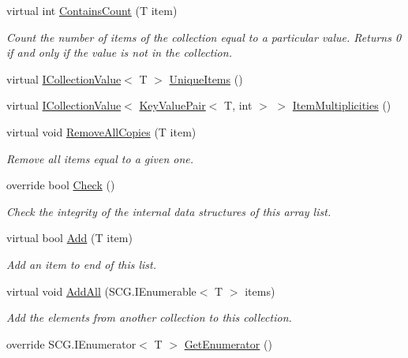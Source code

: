 \begin{DoxyCompactItemize}
virtual int \hyperlink{class_c5_1_1_hashed_array_list_a4fb06172f38039104765ee9d6ed78842}{Contains\+Count} (T item)
\begin{DoxyCompactList}\small\item\em Count the number of items of the collection equal to a particular value. Returns 0 if and only if the value is not in the collection. \end{DoxyCompactList}\item 
virtual \hyperlink{interface_c5_1_1_i_collection_value}{I\+Collection\+Value}$<$ T $>$ \hyperlink{class_c5_1_1_hashed_array_list_ab51e4a315e9d2a09ff389f64bc7a13a1}{Unique\+Items} ()
\item 
virtual \hyperlink{interface_c5_1_1_i_collection_value}{I\+Collection\+Value}$<$ \hyperlink{struct_c5_1_1_key_value_pair}{Key\+Value\+Pair}$<$ T, int $>$ $>$ \hyperlink{class_c5_1_1_hashed_array_list_a8a36b62fa880e713de8e5d8ccfd19595}{Item\+Multiplicities} ()
\item 
virtual void \hyperlink{class_c5_1_1_hashed_array_list_a5b7779ece9c62551eb1c1a24c53906a5}{Remove\+All\+Copies} (T item)
\begin{DoxyCompactList}\small\item\em Remove all items equal to a given one. \end{DoxyCompactList}\item 
override bool \hyperlink{class_c5_1_1_hashed_array_list_aed94ab3e8f52b3cd4b7825b12d6876b2}{Check} ()
\begin{DoxyCompactList}\small\item\em Check the integrity of the internal data structures of this array list. \end{DoxyCompactList}\item 
virtual bool \hyperlink{class_c5_1_1_hashed_array_list_a4606087ab02e09f75ce6810b7a9d11a4}{Add} (T item)
\begin{DoxyCompactList}\small\item\em Add an item to end of this list. \end{DoxyCompactList}\item 
virtual void \hyperlink{class_c5_1_1_hashed_array_list_acf2afaacbfe8474425f2840af10118a3}{Add\+All} (S\+C\+G.\+I\+Enumerable$<$ T $>$ items)
\begin{DoxyCompactList}\small\item\em Add the elements from another collection to this collection. \end{DoxyCompactList}\item 
override S\+C\+G.\+I\+Enumerator$<$ T $>$ \hyperlink{class_c5_1_1_hashed_array_list_a0ce81bee1c45ccbc3105698a4f4692a8}{Get\+Enumerator} ()

\end{DoxyCompactItemize}
